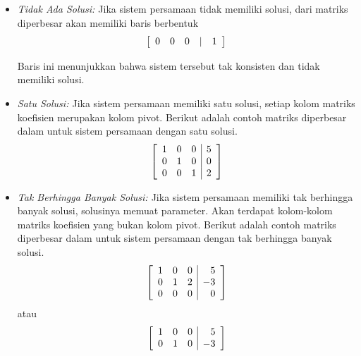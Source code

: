 \begin{itemize}
\item {\em Tidak Ada Solusi: \em}
Jika sistem persamaan tidak memiliki solusi, \ef \;dari matriks diperbesar akan memiliki baris berbentuk
\[
\left[
\begin{array}{rrrrr}
0 & 0 & 0 & | & 1
\end{array}
\right]
\]

Baris ini menunjukkan bahwa sistem tersebut tak konsisten dan tidak memiliki solusi.

\item {\em Satu Solusi: \em}
Jika sistem persamaan memiliki satu solusi, setiap kolom
matriks koefisien merupakan kolom pivot.
Berikut adalah contoh matriks diperbesar dalam \rref \hspace{0.5mm} untuk sistem persamaan dengan satu solusi.
\begin{equation*}
\left[
\begin{array}{rrr|r}
1 & 0 & 0 & 5 \\
0 & 1 & 0 & 0 \\ 
0 & 0 & 1 & 2 
\end{array}
\right]
\end{equation*}

\item {\em Tak Berhingga Banyak Solusi: \em}
Jika sistem persamaan memiliki tak berhingga banyak solusi, solusinya memuat parameter. Akan
terdapat kolom-kolom matriks koefisien yang bukan kolom pivot.
Berikut adalah contoh matriks diperbesar dalam \rref \;untuk sistem persamaan dengan tak berhingga banyak solusi.
\begin{equation*}
\left[
\begin{array}{rrr|r}
1 & 0 & 0 & 5 \\
0 & 1 & 2 & -3 \\ 
0 & 0 & 0 & 0 
\end{array}
\right]
\end{equation*}
atau
\begin{equation*}
\left[
\begin{array}{rrr|r}
1 & 0 & 0 & 5 \\
0 & 1 & 0 & -3
\end{array}
\right]
\end{equation*}

\end{itemize}
